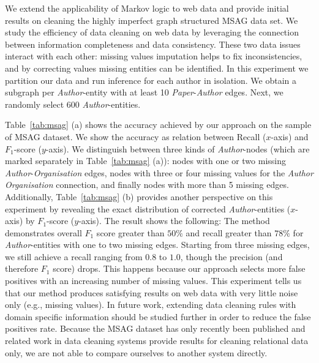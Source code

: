 We extend the applicability of Markov logic to web data and provide initial results on cleaning the highly imperfect graph structured \textsc{MSAG} data set. We study the efficiency of data cleaning on web data by leveraging the connection between information completeness and data consistency. These two data issues interact with each other: missing values imputation helps to fix inconsistencies, and by correcting values missing entities can be identified. %
In this experiment we partition our data and run inference for each author in isolation. We obtain a subgraph per \textit{Author}-entity with at least 10 \textit{Paper}-\textit{Author} edges. Next, we randomly select 600 \textit{Author}-entities. 

Table~\ref{tab:msag} (a) shows the accuracy achieved by our approach on the sample of \textsc{MSAG} dataset. We show the accuracy as relation between Recall ($x$-axis) and $F_1$-score ($y$-axis). We distinguish between three kinds of \textit{Author}-nodes (which are marked separately in Table~\ref{tab:msag} (a)): 
nodes with one or two missing \textit{Author}-\textit{Organisation} edges, nodes with three or four missing values for the \textit{Author} \textit{Organisation} connection, and finally nodes with more than 5 missing edges. Additionally, Table~\ref{tab:msag} (b) provides another perspective on this experiment by revealing the exact distribution of corrected \textit{Author}-entities ($x$-axis) by $F_1$-score ($y$-axis). The result shows the following: The method demonstrates overall $F_1$ score greater than $50\%$ and recall greater than $78\%$ for \textit{Author}-entities with one to two missing edges. Starting from three missing edges, we still achieve a recall ranging from $0.8$ to $1.0$, though the precision (and therefore $F_1$ score) drops. This happens because our approach selects more false positives with an increasing number of missing values. This experiment tells us that our method produces satisfying results on web data with very little noise only (e.g., missing values). In future work, extending data cleaning rules with domain specific information should be studied further in order to reduce the false positives rate. Because the \textsc{MSAG} dataset has only recently been published and related work in data cleaning systems provide results for cleaning relational data only, we are not able to compare ourselves to another system directly.

